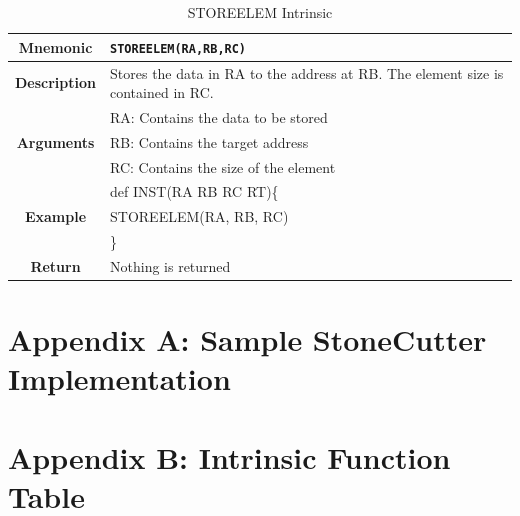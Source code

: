 \documentclass{article}
\begin{document}
\begin{table}[h]
\begin{center}
\caption{STOREELEM Intrinsic}
\vspace{0.125in}
\label{tab:STOREELEMIntrinsic}
\begin{tabular}{|c|l|}
\hline
\textbf{Mnemonic} & \texttt{STOREELEM(RA,RB,RC)}\\
\hline
\textbf{Description} & Stores the data in RA to the address at RB.  The element size is contained in RC.\\
\hline
\multirow{3}{*}{\textbf{Arguments}} & RA: Contains the data to be stored\\
                          			     & RB: Contains the target address \\
			     			     & RC: Contains the size of the element \\
\hline
\multirow{3}{*}{\textbf{Example}} & def INST(RA RB RC RT)\{\\
                          			  &   STOREELEM(RA, RB, RC)\\
                                                    & \}\\
\hline
\textbf{Return} & Nothing is returned\\                                                    
\hline
\end{tabular}
\end{center}
\end{table}

\clearpage
\section{Appendix A: Sample StoneCutter Implementation}
\label{sec:AppendixA}

\vspace{0.125in}


\clearpage
\section{Appendix B: Intrinsic Function Table}
\label{sec:AppendixB}
\end{document}
